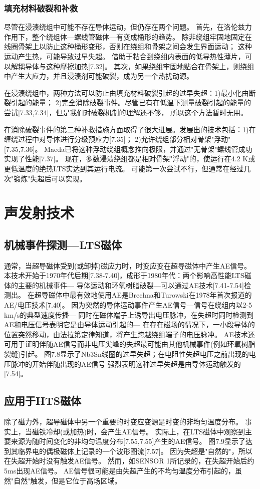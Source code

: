 \subsubsection*{填充材料破裂和补救}
尽管在浸渍绕组中可能不存在导体运动，但仍存在两个问题。
首先，在洛伦兹力作用下，整个绕组体---螺线管磁体---有变成桶形的趋势。
除非绕组牢固地固定在线圈骨架上以防止这种桶形变形，否则在绕组和骨架之间会发生界面运动；
这种运动产生热，可能导致过早失超。
借助于粘合到绕组内表面的低导热性薄片，可以解耦导体与这种摩擦加热[7.32]。
其次，如果绕组牢固地贴合在骨架上，则绕组中产生大应力，并且浸渍剂可能破裂，成为另一个热扰动源。

在浸渍绕组中，两种方法可以防止由填充材料破裂引起的过早失超：1)最小化由断裂引起的能量；
2)完全消除破裂事件。尽管已有在低温下测量破裂引起的能量的尝试[7.33,7.34]，但是我们对破裂机制的理解还不够，
所以这个方法暂时无用。

在消除破裂事件的第二种补救措施方面取得了很大进展。发展出的技术包括：1)在缠绕过程中对导体进行分级预应力[7.35]；
2)允许绕组部分相对骨架"浮动"[7.35,7.36]。
 Maeda已将这种浮动绕组概念推向极限，并通过"无骨架"螺线管成功实现了性能[7.37]。
 现在，多数浸渍绕组都是相对骨架"浮动"的，使运行在4.2 K或更低温度的绝热LTS实达到其运行电流。
 可能第一次尝试不行，但通常在经过几次"锻炼"失超后可以实现。


\section{声发射技术}
\subsection{机械事件探测---LTS磁体}
通常，当超导磁体受到(或卸掉)磁应力时，时变应变在超导磁体中产生AE信号。
本技术开始于1970年代后期[7.38-7.40]，成形于1980年代：两个影响高性能LTS磁体的主要的机械事件---
导体运动和环氧树脂破裂---可以通过AE技术[7.41-7.54]检测出。
在超导磁体中最有效地使用AE是Brechna和Turowski在1978年首次报道的AE/电压技术[7.40]。
因为突然的导体运动事件产生AE信号---信号在绕组内以2-5 km/s的典型速度传播---
同时在磁体端子上诱导出电压脉冲，在失超时同时检测到AE和电压信号表明它是由导体运动引起的---
在存在磁场的情况下，一小段导体的位置突然移动，由法拉第定律知道，将产生跨越绕组端子的电压脉冲。 
AE技术还可用于证明伴随AE信号而非电压尖峰的失超最可能由其他机械事件(例如环氧树脂裂缝)引起。
图7.8显示了Nb3Sn线圈的过早失超；在电阻性失超电压之前出现的电压脉冲的开始伴随出现的AE信号
强烈表明这种过早失超是由导体运动触发的[7.54]。

\subsection{应用于HTS磁体}
除了磁力外，超导磁体中另一个重要的时变应变源是时变的非均匀温度分布。
事实上，当磁铁冷却(或加热)时，会产生AE信号。
实际上，在LTS磁体中观察到主要来源为随时间变化的非均匀温度分布[7.55,7.55]产生的AE信号。
图7.9显示了达到其临界电的偶极磁体上记录的一个波形图流[7.57]。
因为失超是"自然的"，所以在失超开始时没有触发AE信号。
然而，如SENSOR 1所记录的，在失超开始后约5ms出现AE信号。
AE信号很可能是由失超产生的不均匀温度分布引起的，虽然"自然"触发，但是它位于高场区域。


